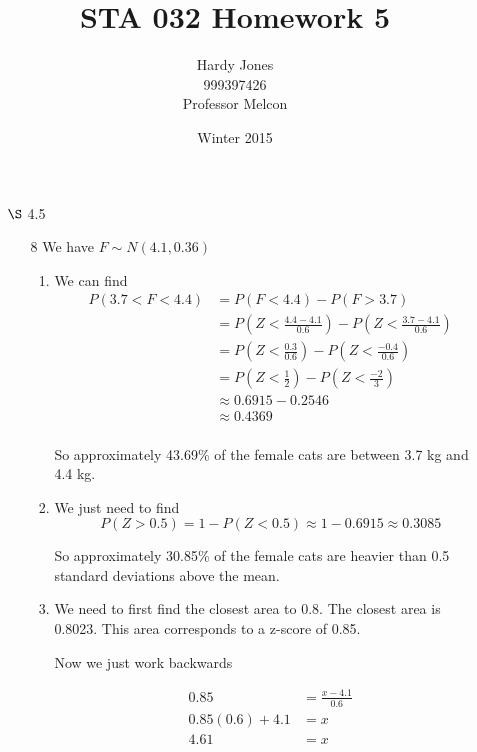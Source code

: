 \documentclass[12pt,letterpaper]{article}
\title{STA 032 Homework 5\vspace{-2ex}}
\author{Hardy Jones\\
        999397426\\
        Professor Melcon\vspace{-2ex}}
\date{Winter 2015}
\begin{document}
  \maketitle

  \begin{enumerate}
    \item [$\S$ 4.5]
      \begin{enumerate}
        \item [8]
          We have $F \sim N(4.1, 0.36)$
          \begin{enumerate}[label=(\arabic*)]
            \item
              We can find
              \begin{align*}
                P(3.7 < F < 4.4) &= P(F < 4.4) - P(F > 3.7) \\
                &= P\left(Z < \frac{4.4 - 4.1}{0.6}\right) -  P\left(Z < \frac{3.7 - 4.1}{0.6}\right) \\
                &= P\left(Z < \frac{0.3}{0.6}\right) -  P\left(Z < \frac{- 0.4}{0.6}\right) \\
                &= P\left(Z < \frac{1}{2}\right) -  P\left(Z < \frac{-2}{3}\right) \\
                &\approx 0.6915 -  0.2546 \\
                &\approx 0.4369 \\
              \end{align*}

              So approximately 43.69\% of the female cats are between 3.7 kg and 4.4 kg.
            \item
              We just need to find
              \[
                P(Z > 0.5) = 1 - P(Z < 0.5) \approx 1 - 0.6915 \approx 0.3085
              \]

              So approximately 30.85\% of the female cats are heavier than 0.5 standard deviations above the mean.
            \item
              We need to first find the closest area to 0.8.
              The closest area is 0.8023.
              This area corresponds to a z-score of 0.85.

              Now we just work backwards

              \begin{align*}
                0.85 &= \frac{x - 4.1}{0.6} \\
                0.85(0.6) + 4.1 &= x \\
                4.61 &= x \\
              \end{align*}


\end{enumerate}
\end{enumerate}
\end{enumerate}
\end{document}
